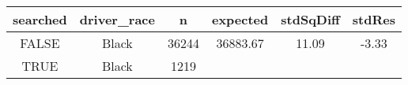\documentclass[]{book}
\theoremstyle{definition}
\theoremstyle{definition}
\theoremstyle{definition}
\theoremstyle{remark}
\begin{document}
\begin{longtable}[]{@{}cccccc@{}}
\toprule
\begin{minipage}[b]{0.13\columnwidth}\centering\strut
searched\strut
\end{minipage} & \begin{minipage}[b]{0.16\columnwidth}\centering\strut
driver\_race\strut
\end{minipage} & \begin{minipage}[b]{0.10\columnwidth}\centering\strut
n\strut
\end{minipage} & \begin{minipage}[b]{0.13\columnwidth}\centering\strut
expected\strut
\end{minipage} & \begin{minipage}[b]{0.14\columnwidth}\centering\strut
stdSqDiff\strut
\end{minipage} & \begin{minipage}[b]{0.09\columnwidth}\centering\strut
stdRes\strut
\end{minipage}\tabularnewline
\midrule
\endhead
\begin{minipage}[t]{0.13\columnwidth}\centering\strut
FALSE\strut
\end{minipage} & \begin{minipage}[t]{0.16\columnwidth}\centering\strut
Black\strut
\end{minipage} & \begin{minipage}[t]{0.10\columnwidth}\centering\strut
36244\strut
\end{minipage} & \begin{minipage}[t]{0.13\columnwidth}\centering\strut
36883.67\strut
\end{minipage} & \begin{minipage}[t]{0.14\columnwidth}\centering\strut
11.09\strut
\end{minipage} & \begin{minipage}[t]{0.09\columnwidth}\centering\strut
-3.33\strut
\end{minipage}\tabularnewline
\begin{minipage}[t]{0.13\columnwidth}\centering\strut
TRUE\strut
\end{minipage} & \begin{minipage}[t]{0.16\columnwidth}\centering\strut
Black\strut
\end{minipage} & \begin{minipage}[t]{0.10\columnwidth}\centering\strut
1219\strut
\end{minipage} & \begin{minipage}[t]{0.13\columnwidth}\centering\strut

\end{minipage}
\end{longtable}
\end{document}
